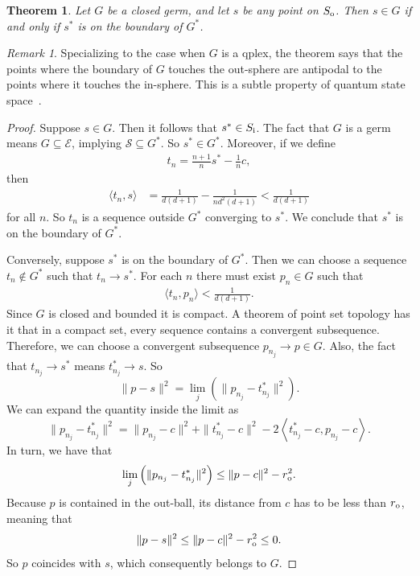 \documentclass[aps,pra,superscriptaddress,10pt,tightenlines,twocolumn,nofootinbib]{revtex4}
\newtheorem{theorem}{Theorem}
\theoremstyle{remark}
\newtheorem*{remark}{Remark}
\newcommand{\be}{\begin{equation}}
\newcommand{\ee}{\end{equation}}
\newcommand{\ea}[1]{\begin{align}#1\end{align}}
\newcommand{\la}{\langle}
\newcommand{\ra}{\rangle}
\newcommand{\dl}[1]{#1^{*}}
\newcommand{\so}{S_{\rm{o}}}
\newcommand{\si}{S_{\rm{i}}}
\newcommand{\ro}{r_{\rm{o}}}
\newcommand{\ri}{r_{\rm{i}}}
\newcommand{\pr}{G}
\newcommand{\qplex}{qplex}
\newcommand{\inprod}[2]{{\left\langle #1 , #2 \right\rangle}}
\newcommand{\stm}{\mathscr{S}}
\newcommand{\env}{\mathscr{E}}
\begin{document}
\begin{theorem}
\label{thm:dualOfPtOnSo}
Let $\pr$ be a closed germ, and let $s$ be any point on $\so$.  Then $s\in \pr$ if and only if $\dl{s}$  is on the boundary of $\dl{\pr}$.
\end{theorem}
\begin{remark}
Specializing to the case when $\pr$ is a \qplex, the theorem says that the points where the boundary of $\pr$ touches the out-sphere are antipodal to the points where it touches the in-sphere.  This is a subtle property of quantum state space~\cite{Kimura2005, Appleby2007}.
\end{remark}
\begin{proof}
Suppose $s\in \pr$.  Then it follows that $\dl{s} \in \si$.  The fact that $\pr$ is a germ means $\pr \subseteq\env$, implying $\stm \subseteq \dl{\pr}$.  So $\dl{s} \in \dl{\pr}$.  Moreover, if we define
\ea{
t_n = \frac{n+1}{n} \dl{s} -\frac{1}{n} c,
}
then
\ea{
\la t_n , s\ra
&= \frac{1}{d(d+1)} - \frac{1}{nd^2(d+1)} < \frac{1}{d(d+1)}
}
for all $n$.  So $t_n$ is a sequence outside $\dl{\pr}$ converging to $\dl{s}$.  We conclude that $\dl{s}$ is on the boundary of $\dl{\pr}$.

Conversely, suppose $\dl{s}$ is on the boundary of $\dl{\pr}$.  Then we can choose a sequence $t_n \notin \dl{\pr}$ such that $t_n \to \dl{s}$.  For each $n$ there must exist $p_n\in \pr$ such that
\ea{
\la t_n , p_n \ra < \frac{1}{d(d+1)}.
}
Since $\pr$ is closed and bounded it is compact.  A theorem of point
set topology has it that in a compact set, every sequence contains a
convergent subsequence.  Therefore, we can choose a convergent
subsequence $p_{n_j} \to p\in \pr$.  Also, the fact that $t_{n_j} \to
\dl{s}$ means $\dl{t}_{n_j} \to s$.  So
\be
\| p - s\|^2 = \lim_j \left( \| p_{n_j} - \dl{t}_{n_j}\|^2 \right).
\ee
We can expand the quantity inside the limit as
\be
\| p_{n_j} - \dl{t}_{n_j}\|^2
 =
\|p_{n_j}-c\|^2 + \|\dl{t}_{n_j}-c\|^2 - 2 \inprod{\dl{t}_{n_j}-c}{p_{n_j}-c}.
\ee
In turn, we have that
\be
\lim_j \left( \| p_{n_j} - \dl{t}_{n_j}\|^2 \right)
 \leq
\|p-c\|^2 - \ro^2.
\ee
Because $p$ is contained in the out-ball, its distance from $c$ has to be less than $\ro$, meaning that
\be
\| p - s\|^2 \leq \|p-c\|^2 - \ro^2 \leq 0.
\ee
So $p$ coincides with $s$, which consequently belongs to $\pr$.
\end{proof}
\end{document}
